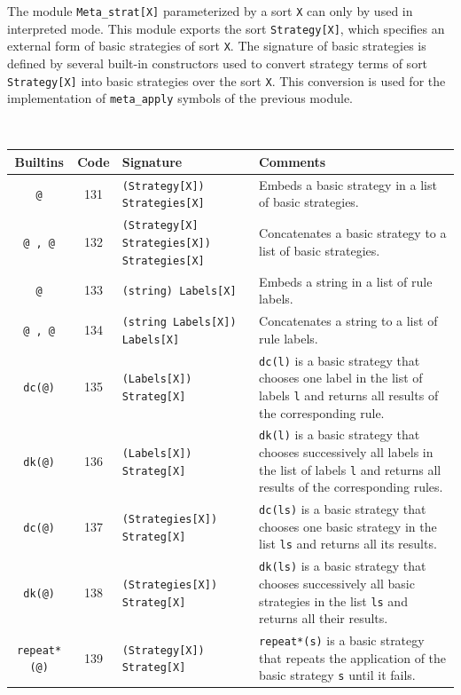 
The module {\tt Meta\_strat[X]} parameterized by a sort {\tt X} can
only by used in interpreted mode.  This module exports the sort 
{\tt Strategy[X]}, which specifies an external form of basic strategies
of sort {\tt X}.  The signature of basic strategies is defined by
several built-in constructors used to convert strategy terms of sort
{\tt Strategy[X]} into basic strategies over the sort {\tt X}.  This
conversion is used for the implementation of {\tt meta\_apply} symbols
of the previous module.

~\\
\begin{tabular}{|c|c|p{5cm}|p{}|}
\hline
{\bf Builtins} & {\bf Code} & {\bf Signature} & {\bf Comments} \\
\hline
\hline
{\tt @}                 & 131 & {\tt (Strategy[X]) Strategies[X]} & Embeds a basic strategy in a list of basic strategies. \\
{\tt @ , @}             & 132 & {\tt (Strategy[X] Strategies[X]) Strategies[X]} & Concatenates a basic strategy to a list of basic strategies.\\
{\tt @}                 & 133 & {\tt (string) Labels[X]} & Embeds a string in a list of rule labels.\\
{\tt @ , @}             & 134 & {\tt (string Labels[X]) Labels[X]} & Concatenates a string to a list of rule labels.\\
{\tt dc(@)}             & 135 & {\tt (Labels[X]) Strateg[X]} & {\tt dc(l)} is a basic strategy that chooses one label in the list of labels {\tt l} and returns all results of the corresponding rule.\\
{\tt dk(@)}             & 136 & {\tt (Labels[X]) Strateg[X]} & {\tt dk(l)} is a basic strategy that chooses successively all labels in the list of labels {\tt l} and returns all results of the corresponding rules.\\
{\tt dc(@)}             & 137 & {\tt (Strategies[X]) Strateg[X]} & {\tt dc(ls)} is a basic strategy that chooses one basic strategy in the list {\tt ls} and returns all its results.\\
{\tt dk(@)}             & 138 & {\tt (Strategies[X]) Strateg[X]} & {\tt dk(ls)} is a basic strategy that chooses successively all basic strategies in the list {\tt ls}  and returns all their results.\\
{\tt repeat*(@)}        & 139 & {\tt (Strategy[X]) Strateg[X]} & {\tt repeat*(s)} is a basic strategy that repeats the application of the basic strategy {\tt s} until it fails.\\

\end{tabular}
